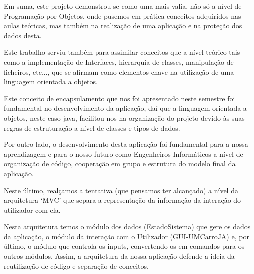 \documentclass[a4paper,11pt]{report}
\begin{document}
\hspace{0.5cm} Em suma, este projeto demonstrou-se como uma mais valia, não só a nível de Programação por Objetos, onde pusemos em prática conceitos adquiridos nas aulas teóricas, mas também na realização de uma aplicação e na proteção dos dados desta. \par
\vspace{0.5cm}
Este trabalho serviu também para assimilar conceitos que a nível teórico tais como a implementação de Interfaces, hierarquia de classes, manipulação de ficheiros, etc..., que se afirmam como elementos chave na utilização de uma linguagem orientada a objetos.
\vspace{0.5cm} \par
Este conceito de encapsulamento que nos foi apresentado neste semestre foi fundamental no desenvolvimento da aplicação, daí que a linguagem orientada a objetos, neste caso java, facilitou-nos na organização do projeto devido às suas regras de estruturação a nível de classes e tipos de dados.
\vspace{0.5cm}\par
Por outro lado, o desenvolvimento desta aplicação foi fundamental para a nossa aprendizagem e para o nosso futuro como Engenheiros Informáticos a nível de organização de código, cooperação em grupo e estrutura do modelo final da aplicação. 
\vspace{0.5cm}\par
Neste último, realçamos a tentativa (que pensamos ter alcançado) a nível da arquitetura ‘MVC’ que separa a representação da informação da interação do utilizador com ela. 
\vspace{0.5cm}\par
Nesta arquitetura temos o módulo dos dados (EstadoSistema) que gere os dados da aplicação, o módulo da interação com o Utilizador (GUI-UMCarroJA) e, por último, o módulo que controla os inputs, convertendo-os em comandos para os outros módulos. Assim, a arquitetura da nossa aplicação defende a ideia da reutilização de código e separação de conceitos.
\end{document}
